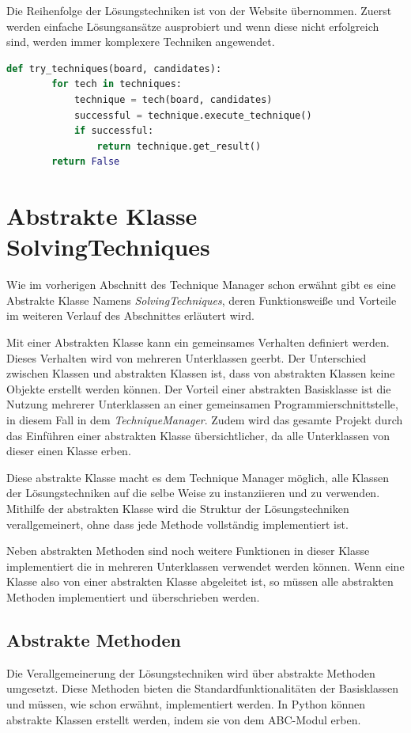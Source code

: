 Die Reihenfolge der Lösungstechniken ist von der Website \cite{martin} übernommen. Zuerst werden einfache Lösungsansätze ausprobiert und wenn diese nicht erfolgreich sind, werden immer komplexere Techniken angewendet. 

\begin{lstlisting}[language=Python, caption={Funktion um eine anwendbare Lösungstechnik zu finden}, label={lst:try}]
	def try_techniques(board, candidates):
		for tech in techniques:
			technique = tech(board, candidates)
			successful = technique.execute_technique()
			if successful:
				return technique.get_result()
		return False
\end{lstlisting}

\section{Abstrakte Klasse SolvingTechniques}

Wie im vorherigen Abschnitt des Technique Manager schon erwähnt gibt es eine Abstrakte Klasse Namens \textit{SolvingTechniques}, deren Funktionsweiße und Vorteile im weiteren Verlauf des Abschnittes erläutert wird. 

Mit einer Abstrakten Klasse kann ein gemeinsames Verhalten definiert werden. Dieses Verhalten wird von mehreren Unterklassen geerbt. Der Unterschied zwischen Klassen und abstrakten Klassen ist, dass von abstrakten Klassen keine Objekte erstellt werden können. Der Vorteil einer abstrakten Basisklasse ist die Nutzung mehrerer Unterklassen an einer gemeinsamen Programmierschnittstelle, in diesem Fall in dem \textit{TechniqueManager}. Zudem wird das gesamte Projekt durch das Einführen einer abstrakten Klasse übersichtlicher, da alle Unterklassen von dieser einen Klasse erben.

Diese abstrakte Klasse macht es dem Technique Manager möglich, alle Klassen der Lösungstechniken auf die selbe Weise zu instanziieren und zu verwenden. Mithilfe der abstrakten Klasse wird die Struktur der Lösungstechniken verallgemeinert, ohne dass jede Methode vollständig implementiert ist. 

Neben abstrakten Methoden sind noch weitere Funktionen in dieser Klasse implementiert die in mehreren Unterklassen verwendet werden können. Wenn eine Klasse also von einer abstrakten Klasse abgeleitet ist, so müssen alle abstrakten Methoden implementiert und überschrieben werden. 

\subsection{Abstrakte Methoden}
Die Verallgemeinerung der Lösungstechniken wird über abstrakte Methoden umgesetzt. Diese Methoden bieten die Standardfunktionalitäten der Basisklassen und müssen, wie schon erwähnt, implementiert werden. In Python können abstrakte Klassen erstellt werden, indem sie von dem ABC-Modul erben.

